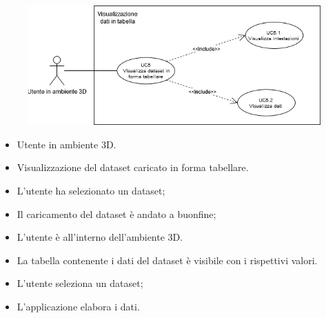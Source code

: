 \begin{figure}[h!]
    \centering
    \includegraphics[scale=0.7]{template/images/UC5.png}
    \caption{}
\end{figure}
\UCdsc
    { %
        \begin{itemize}
            \item Utente in ambiente 3D.
        \end{itemize}
    }
    { %
        \begin{itemize}
            \item Visualizzazione del dataset caricato in forma tabellare.
        \end{itemize}
    }
    { %
        \begin{itemize}
            \item L'utente ha selezionato un dataset;
            \item Il caricamento del dataset è andato a buonfine;
            \item L'utente è all'interno dell'ambiente 3D.
        \end{itemize}
    }
    { %
        \begin{itemize}
            \item La tabella contenente i dati del dataset è visibile con i rispettivi valori.
        \end{itemize}
    }
    { %
        \begin{itemize}
            \item L'utente seleziona un dataset;
            \item L'applicazione elabora i dati.
        \end{itemize}
    }


